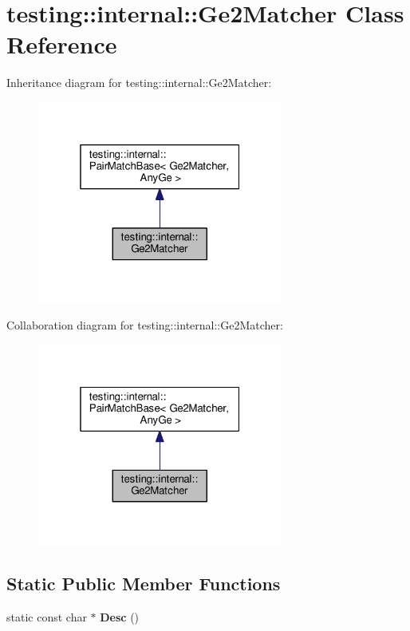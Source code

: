 \hypertarget{classtesting_1_1internal_1_1Ge2Matcher}{}\section{testing\+:\+:internal\+:\+:Ge2\+Matcher Class Reference}
\label{classtesting_1_1internal_1_1Ge2Matcher}


Inheritance diagram for testing\+:\+:internal\+:\+:Ge2\+Matcher\+:\nopagebreak
\begin{figure}[H]
\begin{center}
\leavevmode
\includegraphics[width=229pt]{classtesting_1_1internal_1_1Ge2Matcher__inherit__graph}
\end{center}
\end{figure}


Collaboration diagram for testing\+:\+:internal\+:\+:Ge2\+Matcher\+:\nopagebreak
\begin{figure}[H]
\begin{center}
\leavevmode
\includegraphics[width=229pt]{classtesting_1_1internal_1_1Ge2Matcher__coll__graph}
\end{center}
\end{figure}
\subsection*{Static Public Member Functions}
\begin{DoxyCompactItemize}
\item 
static const char $\ast$ {\bfseries Desc} ()\hypertarget{classtesting_1_1internal_1_1Ge2Matcher_a29fa53bdfa6778b709eaef017aeea855}{}\label{classtesting_1_1internal_1_1Ge2Matcher_a29fa53bdfa6778b709eaef017aeea855}

\end{DoxyCompactItemize}
